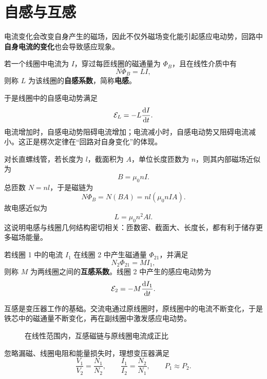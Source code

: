 \section{自感与互感}

电流变化会改变自身产生的磁场，因此不仅外磁场变化能引起感应电动势，回路中\textbf{自身电流的变化}也会导致感应现象。

\begin{definition}
若一个线圈中电流为 $I$，穿过每匝线圈的磁通量为 $\Phi_B$，且在线性介质中有
\[
N\Phi_B=LI,
\]
则称 $L$ 为该线圈的\textbf{自感系数}，简称\textbf{电感}。
\end{definition}

于是线圈中的自感电动势满足
\[
\mathcal{E}_L=-L\dv{I}{t}.
\]
电流增加时，自感电动势阻碍电流增加；电流减小时，自感电动势又阻碍电流减小。这正是楞次定律在“回路对自身变化”的体现。

对长直螺线管，若长度为 $l$，截面积为 $A$，单位长度匝数为 $n$，则其内部磁场近似为
\[
B=\mu_0 n I.
\]
总匝数 $N=nl$，于是磁链为
\[
N\Phi_B=N(BA)=nl(\mu_0 n I A).
\]
故电感近似为
\[
L=\mu_0 n^2 A l.
\]
这说明电感与线圈几何结构密切相关：匝数密、截面大、长度长，都有利于储存更多磁场能量。

\begin{definition}
若线圈 1 中的电流 $I_1$ 在线圈 2 中产生磁通量 $\Phi_{21}$，并满足
\[
N_2\Phi_{21}=M I_1,
\]
则称 $M$ 为两线圈之间的\textbf{互感系数}。线圈 2 中产生的感应电动势为
\[
\mathcal{E}_2=-M\dv{I_1}{t}.
\]
\end{definition}

互感是变压器工作的基础。交流电通过原线圈时，原线圈中的电流不断变化，于是铁芯中的磁通量不断变化，再在副线圈中激发感应电动势。

\begin{figure}[htbp]
\centering
{}
\caption{在线性范围内，互感磁链与原线圈电流成正比}
\end{figure}

\begin{law}[理想变压器关系]
忽略漏磁、线圈电阻和能量损失时，理想变压器满足
\[
\frac{V_1}{V_2}=\frac{N_1}{N_2},
\qquad
\frac{I_1}{I_2}=\frac{N_2}{N_1},
\qquad
P_1\approx P_2.
\]
\end{law}

